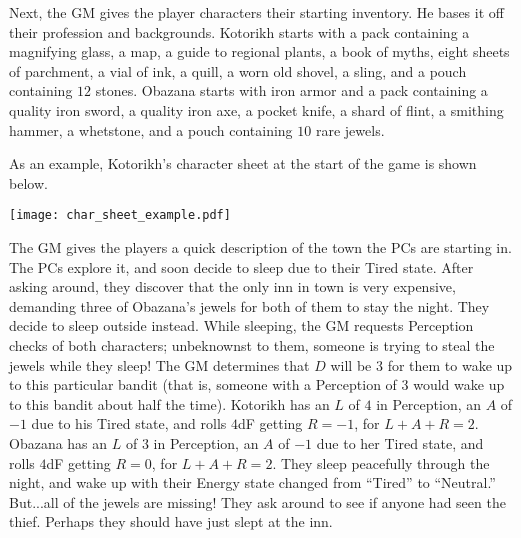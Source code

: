 \begin{example}
Next, the GM gives the player characters their starting inventory.
He bases it off their profession and backgrounds.
Kotorikh starts with a pack containing a magnifying glass, a map, a guide to regional plants, a book of myths, eight sheets of parchment, a vial of ink, a quill,
a worn old shovel, a sling, and a pouch containing $12$ stones.
Obazana starts with iron armor and a pack containing a quality iron sword, a quality iron axe, a pocket knife, a shard of flint, a smithing hammer, a whetstone,
and a pouch containing $10$ rare jewels.

As an example, Kotorikh’s character sheet at the start of the game is shown below.

\begin{center}
\texttt{[image: char\_sheet\_example.pdf]}
\end{center}

The GM gives the players a quick description of the town the PCs are starting in.
The PCs explore it, and soon decide to sleep due to their Tired state.
After asking around, they discover that the only inn in town is very expensive, demanding three of Obazana’s jewels for both of them to stay the night.
They decide to sleep outside instead.
While sleeping, the GM requests Perception checks of both characters; unbeknownst to them, someone is trying to steal the jewels while they sleep!
The GM determines that $D$ will be $3$ for them to wake up to this particular bandit (that is, someone with a Perception of $3$ would wake up to this bandit about half the time).
Kotorikh has an $L$ of $4$ in Perception, an $A$ of $-1$ due to his Tired state, and rolls $4$dF getting $R = -1$, for $L+A+R = 2$.
Obazana has an $L$ of $3$ in Perception, an $A$ of $-1$ due to her Tired state, and rolls $4$dF getting $R = 0$, for $L+A+R = 2$.
They sleep peacefully through the night, and wake up with their Energy state changed from “Tired” to “Neutral.” But...all of the jewels are missing!
They ask around to see if anyone had seen the thief.
Perhaps they should have just slept at the inn.

\end{example}


